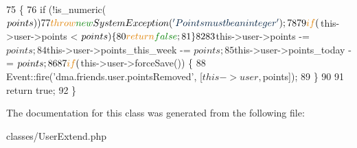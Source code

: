 \begin{DoxyCode}
75     \{
76         \textcolor{keywordflow}{if} (!is\_numeric($points))
77             \textcolor{keywordflow}{throw} \textcolor{keyword}{new} SystemException(\textcolor{stringliteral}{'Points must be an integer'});
78 
79         \textcolor{keywordflow}{if} ($this->user->points < $points) \{
80             \textcolor{keywordflow}{return} \textcolor{keyword}{false};
81         \}
82 
83         $this->user->points -= $points;        
84         $this->user->points\_this\_week -= $points;
85         $this->user->points\_today -= $points;
86         
87         \textcolor{keywordflow}{if} ($this->user->forceSave()) \{
88             Event::fire(\textcolor{stringliteral}{'dma.friends.user.pointsRemoved'}, [$this->user, $points]);
89         \}
90 
91         \textcolor{keywordflow}{return} \textcolor{keyword}{true};
92     \}
\end{DoxyCode}


The documentation for this class was generated from the following file\-:\begin{DoxyCompactItemize}
\item 
classes/User\-Extend.\-php\end{DoxyCompactItemize}
